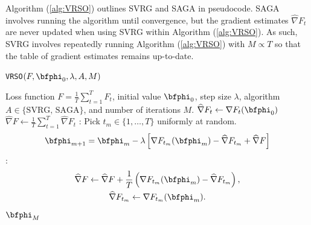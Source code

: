 %
%
%
%
Algorithm (\ref{alg:VRSO}) outlines SVRG and SAGA in pseudocode. SAGA involves running the algorithm until convergence, but the gradient estimates $\widehat \nabla F_t$ are never updated when using SVRG within Algorithm (\ref{alg:VRSO}). As such, SVRG involves repeatedly running Algorithm (\ref{alg:VRSO}) with $M \propto T$ so that the table of gradient estimates remains up-to-date.

\begin{algorithm}
\caption{\texttt{VRSO}$(F,\bfphi_0,\lambda,A,M)$}\label{alg:VRSO}
\begin{algorithmic}[1]
\Require Loss function $F = \frac{1}{T}\sum_{t=1}^T F_t$, initial value $\bfphi_0$, step size $\lambda$, algorithm $A \in \{\text{SVRG, SAGA}\}$, and number of iterations $M$.
%
\vspace{5pt}
 
\State $\widehat \nabla F_t \leftarrow \nabla F_t (\bfphi_0)$
\EndFor
\State $\widehat \nabla F \gets \frac{1}{T} \sum_{t=1}^T \widehat \nabla F_{t}$
%
:
    \State Pick $t_{m} \in \{1,\ldots,T\}$ uniformly at random.
    \State {}
    \begin{gather}
        \bfphi_{m+1} = \bfphi_{m} - \lambda \left[\nabla F_{t_m}(\bfphi_{m}) - \widehat \nabla F_{t_{m}} + \widehat \nabla F \right]
        \label{eqn:SAGA_update0}
    \end{gather}
    :
        \begin{gather}
            \widehat \nabla F \gets \widehat \nabla F + \frac{1}{T} \left( \nabla F_{t_m}(\bfphi_{m}) - \widehat \nabla F_{t_{m}}\right), \\
            \widehat \nabla F_{t_{m}} \gets \nabla F_{t_m}(\bfphi_{m}).
        \end{gather}
    \EndIf
\EndFor
\State \Return $\bfphi_M$
\end{algorithmic}
\end{algorithm}



